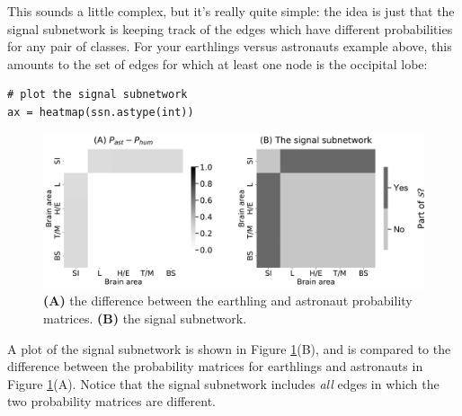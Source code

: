 This sounds a little complex, but it's really quite simple: the idea is just that the signal subnetwork is keeping track of the edges which have different probabilities for any pair of classes. For your earthlings versus astronauts example above, this amounts to the set of edges for which at least one node is the occipital lobe:

\begin{lstlisting}[style=python]
# plot the signal subnetwork
ax = heatmap(ssn.astype(int))
\end{lstlisting}

\begin{figure}
    \centering
    \includegraphics[width=\linewidth]{representations/ch5/Images/ssg_ssn.png}
    \caption[Signal subnetwork for earthling and astronaut examples]{\textbf{(A)} the difference between the earthling and astronaut probability matrices. \textbf{(B)} the signal subnetwork.}
    \label{fig:ch5:ssg_ssn}
\end{figure}

A plot of the signal subnetwork is shown in Figure \ref{fig:ch5:ssg_ssn}(B), and is compared to the difference between the probability matrices for earthlings and astronauts in Figure \ref{fig:ch5:ssg_ssn}(A). Notice that the signal subnetwork includes \textit{all} edges in which the two probability matrices are different. 

